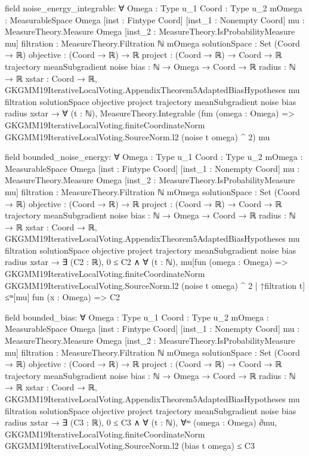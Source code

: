 \documentclass[10pt]{article}
\begin{document}
\begin{ReviewVerbatim}
field noise_energy_integrable:
∀ {Omega : Type u_1} {Coord : Type u_2} {mOmega : MeasurableSpace Omega} [inst : Fintype Coord]
  [inst_1 : Nonempty Coord] {mu : MeasureTheory.Measure Omega} [inst_2 : MeasureTheory.IsProbabilityMeasure mu]
  {filtration : MeasureTheory.Filtration ℕ mOmega} {solutionSpace : Set (Coord → ℝ)} {objective : (Coord → ℝ) → ℝ}
  {project : (Coord → ℝ) → Coord → ℝ} {trajectory meanSubgradient noise bias : ℕ → Omega → Coord → ℝ} {radius : ℕ → ℝ}
  {xstar : Coord → ℝ},
  GKGMM19IterativeLocalVoting.AppendixTheorem5AdaptedBiasHypotheses mu filtration solutionSpace objective project
      trajectory meanSubgradient noise bias radius xstar →
    ∀ (t : ℕ),
      MeasureTheory.Integrable
        (fun (omega : Omega) =>
          GKGMM19IterativeLocalVoting.finiteCoordinateNorm GKGMM19IterativeLocalVoting.SourceNorm.l2 (noise t omega) ^
            2)
        mu

field bounded_noise_energy:
∀ {Omega : Type u_1} {Coord : Type u_2} {mOmega : MeasurableSpace Omega} [inst : Fintype Coord]
  [inst_1 : Nonempty Coord] {mu : MeasureTheory.Measure Omega} [inst_2 : MeasureTheory.IsProbabilityMeasure mu]
  {filtration : MeasureTheory.Filtration ℕ mOmega} {solutionSpace : Set (Coord → ℝ)} {objective : (Coord → ℝ) → ℝ}
  {project : (Coord → ℝ) → Coord → ℝ} {trajectory meanSubgradient noise bias : ℕ → Omega → Coord → ℝ} {radius : ℕ → ℝ}
  {xstar : Coord → ℝ},
  GKGMM19IterativeLocalVoting.AppendixTheorem5AdaptedBiasHypotheses mu filtration solutionSpace objective project
      trajectory meanSubgradient noise bias radius xstar →
    ∃ (C2 : ℝ),
      0 ≤ C2 ∧
        ∀ (t : ℕ),
          mu[fun (omega : Omega) =>
              GKGMM19IterativeLocalVoting.finiteCoordinateNorm GKGMM19IterativeLocalVoting.SourceNorm.l2
                  (noise t omega) ^
                2 |
              ↑filtration t] ≤ᵐ[mu]
            fun (x : Omega) => C2

field bounded_bias:
∀ {Omega : Type u_1} {Coord : Type u_2} {mOmega : MeasurableSpace Omega} [inst : Fintype Coord]
  [inst_1 : Nonempty Coord] {mu : MeasureTheory.Measure Omega} [inst_2 : MeasureTheory.IsProbabilityMeasure mu]
  {filtration : MeasureTheory.Filtration ℕ mOmega} {solutionSpace : Set (Coord → ℝ)} {objective : (Coord → ℝ) → ℝ}
  {project : (Coord → ℝ) → Coord → ℝ} {trajectory meanSubgradient noise bias : ℕ → Omega → Coord → ℝ} {radius : ℕ → ℝ}
  {xstar : Coord → ℝ},
  GKGMM19IterativeLocalVoting.AppendixTheorem5AdaptedBiasHypotheses mu filtration solutionSpace objective project
      trajectory meanSubgradient noise bias radius xstar →
    ∃ (C3 : ℝ),
      0 ≤ C3 ∧
        ∀ (t : ℕ),
          ∀ᵐ (omega : Omega) ∂mu,
            GKGMM19IterativeLocalVoting.finiteCoordinateNorm GKGMM19IterativeLocalVoting.SourceNorm.l2 (bias t omega) ≤
              C3


\end{ReviewVerbatim}
\end{document}
